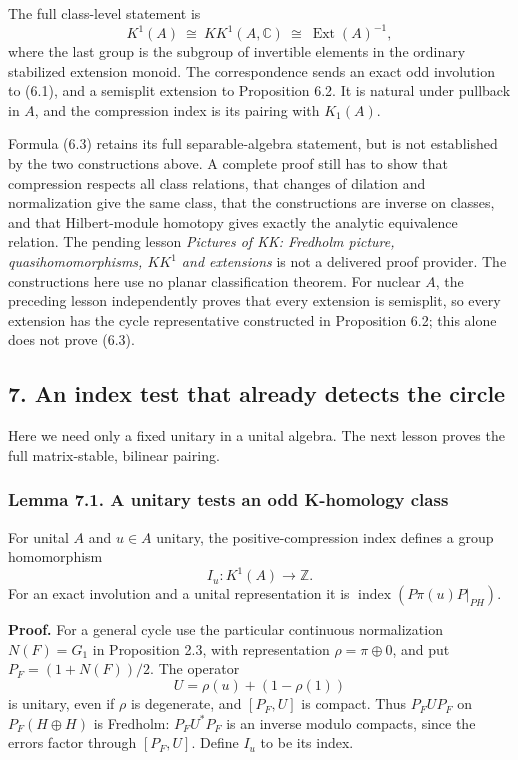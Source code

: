 \documentclass[
  11pt,
]{article}
\begin{document}
The full class-level statement is \[
K^1(A)\ \cong\ KK^1(A,\mathbb C)\
\cong\ \operatorname{Ext}(A)^{-1},
\tag{6.3}
\] where the last group is the subgroup of invertible elements in the
ordinary stabilized extension monoid. The correspondence sends an exact
odd involution to (6.1), and a semisplit extension to Proposition 6.2.
It is natural under pullback in \(A\), and the compression index is its
pairing with \(K_1(A)\).

Formula (6.3) retains its full separable-algebra statement, but is not
established by the two constructions above. A complete proof still has
to show that compression respects all class relations, that changes of
dilation and normalization give the same class, that the constructions
are inverse on classes, and that Hilbert-module homotopy gives exactly
the analytic equivalence relation. The pending lesson \emph{Pictures of
KK: Fredholm picture, quasihomomorphisms, \(KK^1\) and extensions} is
not a delivered proof provider. The constructions here use no planar
classification theorem. For nuclear \(A\), the preceding lesson
independently proves that every extension is semisplit, so every
extension has the cycle representative constructed in Proposition 6.2;
this alone does not prove (6.3).

\subsection{7. An index test that already detects the
circle}\label{an-index-test-that-already-detects-the-circle}

Here we need only a fixed unitary in a unital algebra. The next lesson
proves the full matrix-stable, bilinear pairing.

\subsubsection{Lemma 7.1. A unitary tests an odd K-homology
class}\label{lemma-7.1.-a-unitary-tests-an-odd-k-homology-class}

For unital \(A\) and \(u\in A\) unitary, the positive-compression index
defines a group homomorphism \[
I_u:K^1(A)\longrightarrow\mathbb Z.
\] For an exact involution and a unital representation it is
\(\operatorname{index}(P\pi(u)P|_{PH})\).

\textbf{Proof.} For a general cycle use the particular continuous
normalization \(N(F)=G_1\) in Proposition 2.3, with representation
\(\rho=\pi\oplus0\), and put \(P_F=(1+N(F))/2\). The operator \[
U=\rho(u)+(1-\rho(1))
\] is unitary, even if \(\rho\) is degenerate, and \([P_F,U]\) is
compact. Thus \(P_FUP_F\) on \(P_F(H\oplus H)\) is Fredholm:
\(P_FU^*P_F\) is an inverse modulo compacts, since the errors factor
through \([P_F,U]\). Define \(I_u\) to be its index.
\end{document}

